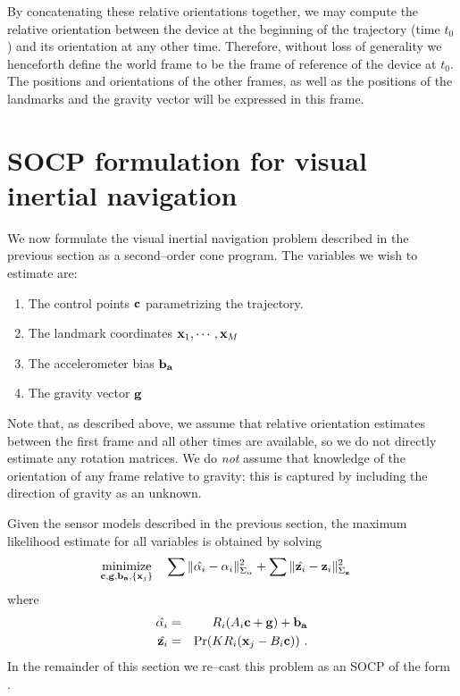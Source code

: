 By concatenating these relative orientations together, we may compute
the relative orientation between the device at the beginning of the
trajectory (time $t_0$) and its orientation at any other
time. Therefore, without loss of generality we henceforth define the
world frame to be the frame of reference of the device at $t_0$. The
positions and orientations of the other frames, as well as the
positions of the landmarks and the gravity vector will be expressed in
this frame.

\section{SOCP formulation for visual inertial navigation}

We now formulate the visual inertial navigation problem described in
the previous section as a second--order cone program. The variables we
wish to estimate are:
\begin{enumerate}
\item{The control points $\mathbf{c}$ parametrizing the trajectory.}
\item{The landmark coordinates $\mathbf{x}_1,\cdots,\mathbf{x}_M$}
\item{The accelerometer bias $\mathbf{b_a}$}
\item{The gravity vector $\mathbf{g}$}
\end{enumerate}
Note that, as described above, we assume that relative orientation
estimates between the first frame and all other times are available,
so we do not directly estimate any rotation matrices. We do
\textit{not} assume that knowledge of the orientation of any frame
relative to gravity; this is captured by including the direction of
gravity as an unknown.

Given the sensor models described in the previous section, the maximum
likelihood estimate for all variables is obtained by solving
\begin{equation}
  \begin{aligned}
    & \underset{\AllVars}{\text{minimize}}
    & & \sum \| \hat{\Accel_i} - \Accel_i \|_{\AccelCov}^2 +
    \sum \| \hat{\Feature_i} - \Feature_i \|_{\FeatureCov}^2
  \end{aligned}
  \label{unconstrained-cost}
\end{equation}
where
\begin{eqnarray}
  \hat{\mathbf{\alpha}_i} &=& R_i (A_i \mathbf{c} + \mathbf{g}) + \mathbf{b_a} \\
  \hat{\mathbf{z}_{i}} &=& \Pr(K R_i (\mathbf{x}_j - B_i \mathbf{c})) ~.
\end{eqnarray}
In the remainder of this section we re--cast this problem as an SOCP
of the form .

